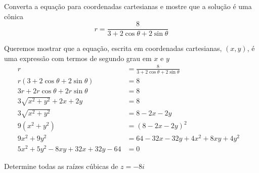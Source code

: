 \documentclass[a4paper,12pt,fleqn]{article}
\begin{document}

Converta a equação para coordenadas cartesianas e mostre que a solução é uma cônica
\[
  r = \frac{8}{3 + 2\cos\theta + 2\sin\theta}
\]
\clearpagequestiononly

\begin{answer}
Queremos mostrar que a equação, escrita em coordenadas cartesianas, $(x, y)$,
é uma expressão com termos de segundo grau em $x$ e $y$
\begin{align*}
  r                                  & = \frac{8}{3 + 2\cos\theta + 2\sin\theta} &  \\
  r(3 + 2\cos\theta + 2\sin\theta)   & = 8                                       &  \\
  3r + 2r\cos\theta + 2r\sin\theta   & = 8                                       &  \\
  3\sqrt{x^2 + y^2} + 2x + 2y        & = 8                                       &  \\
  3\sqrt{x^2 + y^2}                  & = 8 - 2x - 2y                             &  \\
  9(x^2 + y^2)                       & = (8 - 2x - 2y)^2                         &  \\
  9x^2 + 9y^2                        & = 64 - 32x - 32y + 4x^2 + 8xy + 4y^2      &  \\
  5x^2 + 5y^2 - 8xy + 32x + 32y - 64 & = 0                                       &
\end{align*}
\end{answer}

Determine todas as raízes cúbicas de \( z = -8i \)
\clearpagequestiononly
\end{document}
